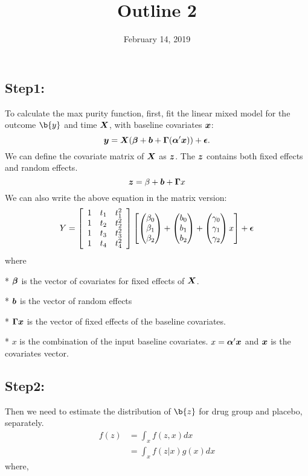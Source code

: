 \documentclass[12pt]{article}
\begin{document}
\title{Outline 2}
\date{February 14, 2019} \maketitle
\subsection{Step1: }

To calculate the max purity function, first,  
fit the linear mixed model for the outcome $\b{y}$ and time $\mbox{\boldmath $X$}$, with baseline covariates $\mbox{\boldmath $x$}$:  
$$\mbox{\boldmath $y$} = \mbox{\boldmath $X$}(\mbox{\boldmath $\beta$} +\mbox{\boldmath $b$} +\mbox{\boldmath $\Gamma$}(\mbox{\boldmath $\alpha$}'\mbox{\boldmath $x$})) + \mbox{\boldmath $\epsilon$}.$$We can define the covariate matrix of $\mbox{\boldmath $X$}$ as $\mbox{\boldmath $z$}$. The $\mbox{\boldmath $z$}$ contains both fixed effects and random effects. 
$$\mbox{\boldmath $z$} = \beta + \mbox{\boldmath $b$} + \mbox{\boldmath $\Gamma$} x$$
We can also write the above equation in the matrix version:
$$Y = \left[\begin{array}
{rrr}
1 & t_1 & t_1^2 \\
1 & t_2 & t_2^2 \\
1 & t_3 & t_3^2 \\
1 & t_4 & t_4^2
\end{array}\right]
\left[\begin{pmatrix}
\beta_0 \\
\beta_1 \\
\beta_2
\end{pmatrix} +  
\begin{pmatrix}
b_0 \\
b_1 \\
b_2
\end{pmatrix} + 
\begin{pmatrix}
\gamma_0 \\
\gamma_1 \\
\gamma_2
\end{pmatrix} x \right] + \mbox{\boldmath $\epsilon$}$$
where 

* $\mbox{\boldmath $\beta$}$ is the vector of covariates for fixed effects of $\mbox{\boldmath $X$}$.

* $\mbox{\boldmath $b$}$ is the vector of random effects 

* $\mbox{\boldmath $\Gamma$} \mbox{\boldmath $x$}$ is the vector of fixed effects of the baseline covariates.

* $x$ is the combination of the input baseline covariates. $x = \mbox{\boldmath $\alpha$}'\mbox{\boldmath $x$}$ and $\mbox{\boldmath $x$}$ is the covariates vector.

\subsection{Step2:}

Then we need to estimate the distribution of $\b{z}$ for drug group and placebo, separately.
$$\begin{aligned}
f(z) &= \int_x f(z,x) dx \\
 & = \int_x f(z|x) g(x) dx
\end{aligned}$$
where,
\end{document}
